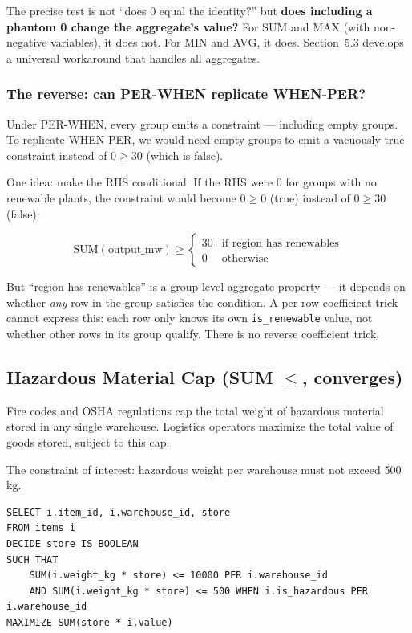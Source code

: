 \documentclass[11pt]{article}
\begin{document}
The precise test is not ``does 0 equal the identity?'' but \textbf{does
including a phantom 0 change the aggregate's value?} For SUM and MAX
(with non-negative variables), it does not. For MIN and AVG, it does.
Section~5.3 develops a universal workaround that handles all aggregates.

\subsubsection*{The reverse: can PER-WHEN replicate WHEN-PER?}

Under PER-WHEN, every group emits a constraint --- including empty groups.
To replicate WHEN-PER, we would need empty groups to emit a vacuously true
constraint instead of $0 \geq 30$ (which is false).

One idea: make the RHS conditional. If the RHS were 0 for groups with no
renewable plants, the constraint would become $0 \geq 0$ (true) instead
of $0 \geq 30$ (false):

\[
\text{SUM}(\text{output\_mw}) \geq
\begin{cases}
30 & \text{if region has renewables} \\
0  & \text{otherwise}
\end{cases}
\]

But ``region has renewables'' is a group-level aggregate property ---
it depends on whether \emph{any} row in the group satisfies the condition.
A per-row coefficient trick cannot express this: each row only knows its
own \texttt{is\_renewable} value, not whether other rows in its group
qualify. There is no reverse coefficient trick.

\subsection{Hazardous Material Cap (SUM $\leq$, converges)}

Fire codes and OSHA regulations cap the total weight of hazardous material
stored in any single warehouse. Logistics operators maximize the total value
of goods stored, subject to this cap.

The constraint of interest: hazardous weight per warehouse must not exceed
500\,kg.

\begin{lstlisting}
SELECT i.item_id, i.warehouse_id, store
FROM items i
DECIDE store IS BOOLEAN
SUCH THAT
    SUM(i.weight_kg * store) <= 10000 PER i.warehouse_id
    AND SUM(i.weight_kg * store) <= 500 WHEN i.is_hazardous PER i.warehouse_id
MAXIMIZE SUM(store * i.value)
\end{lstlisting}
\end{document}
